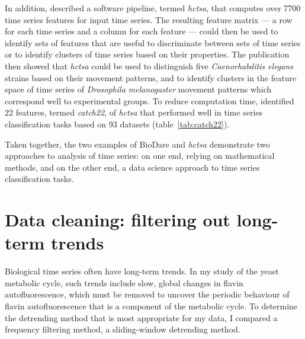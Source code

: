 In addition, \textcite{fulcherHctsaComputationalFramework2017} described a software pipeline, termed \textit{hctsa}, that computes over 7700 time series features for input time series.
The resulting feature matrix --- a row for each time series and a column for each feature --- could then be used to identify sets of features that are useful to discriminate between sets of time series or to identify clusters of time series based on their properties.
The publication then showed that \textit{hctsa} could be used to distinguish five \textit{Caenorhabditis elegans} strains based on their movement patterns, and to identify clusters in the feature space of time series of \textit{Drosophila melanogaster} movement patterns which correspond well to experimental groups.
To reduce computation time, \textcite{lubbaCatch22CAnonicalTimeseries2019} identified 22 features, termed \textit{catch22}, of \textit{hctsa} that performed well in time series classification tasks based on 93 datasets (table~\ref{tab:catch22}).

Taken together, the two examples of BioDare and \textit{hctsa} demonstrate two approaches to analysis of time series: on one end, relying on mathematical methods, and on the other end, a data science approach to time series classification tasks.


\section{Data cleaning: filtering out long-term trends}
\label{sec:analysis-cleaning}

Biological time series often have long-term trends.
In my study of the yeast metabolic cycle, such trends include slow, global changes in flavin autofluorescence, which must be removed to uncover the periodic behaviour of flavin autofluorescence that is a component of the metabolic cycle.
To determine the detrending method that is most appropriate for my data, I compared a frequency filtering method, a sliding-window detrending method.


